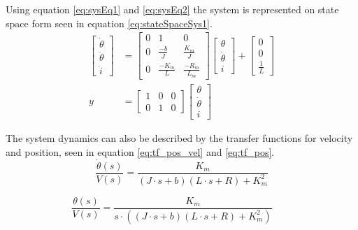 \documentclass[../../main.tex]{subfiles}
\begin{document}
Using equation \ref{eq:sysEq1} and \ref{eq:sysEq2} the system is represented on state space form seen in equation \ref{eq:stateSpaceSys1}.
\begin{equation}\label{eq:stateSpaceSys1}
\begin{split}
\begin{bmatrix}
\dot{\theta}\\
\ddot{\theta}\\
\dot{i}
\end{bmatrix} &=
\begin{bmatrix}
0 & 1 & 0 \\
0 & \frac{-b}{J} & \frac{K_m}{J}\\
0 & \frac{-K_m}{L} & \frac{-R_m}{L_m}
\end{bmatrix}
\begin{bmatrix}
\theta\\
\dot{\theta}\\
i
\end{bmatrix}
+ 
\begin{bmatrix}
0 \\
0 \\
\frac{1}{L}
\end{bmatrix} \\
    y &= 
    \begin{bmatrix}
    1 & 0 & 0\\
    0 & 1 & 0
    \end{bmatrix}
    \begin{bmatrix}
    \theta\\
    \dot{\theta}\\
    i
    \end{bmatrix}
    \end{split}
\end{equation}

The system dynamics can also be described by the transfer functions for velocity and position, seen in equation \ref{eq:tf_pos_vel} and \ref{eq:tf_pos}.
\begin{equation}\label{eq:tf_pos}
    \frac{\dot{\theta}(s)}{V(s)} = \frac{K_m}{(J\cdot s + b)(L\cdot s + R) + K_m^2}
\end{equation}

\begin{equation}
    \frac{\theta(s)}{V(s)} = \frac{K_m}{s\cdot((J\cdot s + b)(L\cdot s + R) + K_m^2)} \qquad 
\end{equation}
\end{document}
